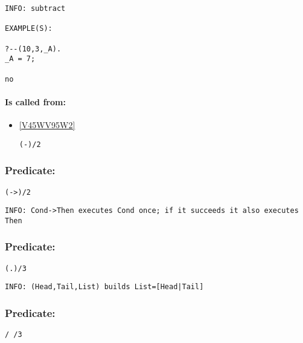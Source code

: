 {\small \begin{verbatim}
INFO: subtract

EXAMPLE(S):

?--(10,3,_A).
_A = 7;

no

\end{verbatim}}
\paragraph{Is called from:} 
\begin{itemize}
\item \ref{V45WV95W2} 
\begin{verbatim}
(-)/2
\end{verbatim}

\end{itemize}

\subsubsection{Predicate:} \label{V45WV62WV95W2}

\begin{verbatim}
(->)/2
\end{verbatim}

{\small \begin{verbatim}
INFO: Cond->Then executes Cond once; if it succeeds it also executes Then

\end{verbatim}}

\subsubsection{Predicate:} \label{V46WV95W3}

\begin{verbatim}
(.)/3
\end{verbatim}

{\small \begin{verbatim}
INFO: (Head,Tail,List) builds List=[Head|Tail]

\end{verbatim}}

\subsubsection{Predicate:} \label{V47WV95W3}

\begin{verbatim}
/ /3
\end{verbatim}

